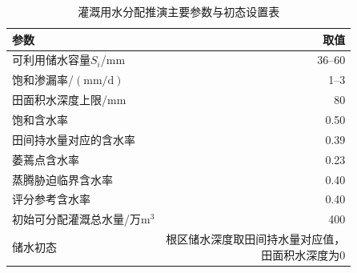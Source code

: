 \begin{table}[H]
 \centering\small
 \caption{灌溉用水分配推演主要参数与初态设置表}
 \label{tab:irrigation-fixed-environment}
 \renewcommand{\arraystretch}{1.15}
 \begin{tabular}{lr}
 \toprule
 参数 & 取值\\
 \midrule
 可利用储水容量\(S_i\)/\(\mathrm{mm}\) & 36--60\\
 饱和渗漏率/\((\mathrm{mm/d})\) & 1--3\\
 田面积水深度上限/\(\mathrm{mm}\) & 80\\
 饱和含水率 & 0.50\\
 田间持水量对应的含水率 & 0.39\\
 萎蔫点含水率 & 0.23\\
 蒸腾胁迫临界含水率 & 0.40\\
 评分参考含水率 & 0.40\\
 初始可分配灌溉总水量/万\(\mathrm{m^3}\) & 400\\
 储水初态 & \shortstack[r]{根区储水深度取田间持水量对应值，\\田面积水深度为0}\\
 \bottomrule
 \end{tabular}
\end{table}
